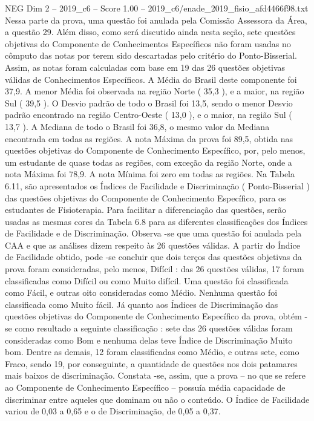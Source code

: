 \begin{textsample}{NEG Dim 2 – 2019\_c6 – Score 1.00 – 2019\_c6/enade\_2019\_fisio\_afd4466f98.txt}
Nessa parte da prova, uma questão foi anulada pela Comissão Assessora da Área, a questão 29.
Além disso, como será discutido ainda nesta seção, sete questões objetivas do Componente de Conhecimentos Específicos não foram usadas no cômputo das notas por terem sido descartadas pelo critério do Ponto-Bisserial.
Assim, as notas foram calculadas com base em 19 das 26 questões objetivas válidas de Conhecimentos Específicos.
A Média do Brasil deste componente foi 37,9.
A menor Média foi observada na região Norte ( 35,3 ), e a maior, na região Sul ( 39,5 ).
O Desvio padrão de todo o Brasil foi 13,5, sendo o menor Desvio padrão encontrado na região Centro-Oeste ( 13,0 ), e o maior, na região Sul ( 13,7 ).
A Mediana de todo o Brasil foi 36,8, o mesmo valor da Mediana encontrada em todas as regiões.
A nota Máxima da prova foi 89,5, obtida nas questões objetivas do Componente de Conhecimento Específico, por, pelo menos, um estudante de quase todas as regiões, com exceção da região Norte, onde a nota Máxima foi 78,9.
A nota Mínima foi zero em todas as regiões.
Na Tabela 6.11, são apresentados os Índices de Facilidade e Discriminação ( Ponto-Bisserial ) das questões objetivas do Componente de Conhecimento Específico, para os estudantes de Fisioterapia.
Para facilitar a diferenciação das questões, serão usadas as mesmas cores da Tabela 6.8 para as diferentes classificações dos Índices de Facilidade e de Discriminação.
Observa -se que uma questão foi anulada pela CAA e que as análises dizem respeito às 26 questões válidas.
A partir do Índice de Facilidade obtido, pode -se concluir que dois terços das questões objetivas da prova foram consideradas, pelo menos, Difícil : das 26 questões válidas, 17 foram classificadas como Difícil ou como Muito difícil.
Uma questão foi classificada como Fácil, e outras oito consideradas como Médio.
Nenhuma questão foi classificada como Muito fácil.
Já quanto aos Índices de Discriminação das questões objetivas do Componente de Conhecimento Específico da prova, obtém -se como resultado a seguinte classificação : sete das 26 questões válidas foram consideradas como Bom e nenhuma delas teve Índice de Discriminação Muito bom.
Dentre as demais, 12 foram classificadas como Médio, e outras sete, como Fraco, sendo 19, por conseguinte, a quantidade de questões nos dois patamares mais baixos de discriminação.
Constata -se, assim, que a prova – no que se refere ao Componente de Conhecimento Específico – possuía média capacidade de discriminar entre aqueles que dominam ou não o conteúdo.
O Índice de Facilidade variou de 0,03 a 0,65 e o de Discriminação, de 0,05 a 0,37.

\end{textsample}
